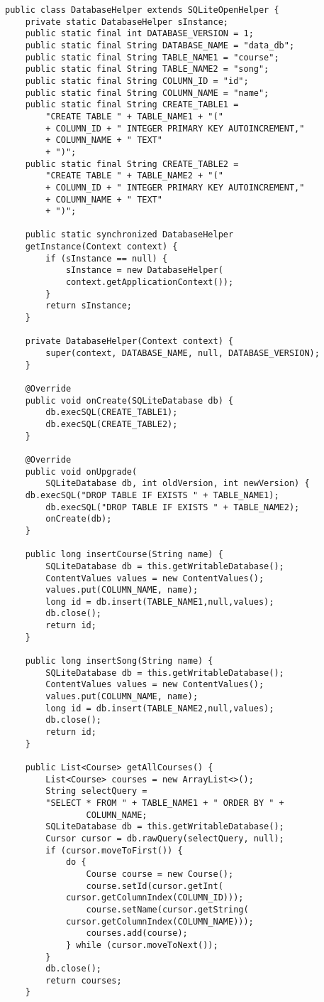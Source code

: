 \documentclass[12pt]{article}
\begin{document}
	\begin{lstlisting}
public class DatabaseHelper extends SQLiteOpenHelper {
    private static DatabaseHelper sInstance;
    public static final int DATABASE_VERSION = 1;
    public static final String DATABASE_NAME = "data_db";
    public static final String TABLE_NAME1 = "course";
    public static final String TABLE_NAME2 = "song";
    public static final String COLUMN_ID = "id";
    public static final String COLUMN_NAME = "name";
    public static final String CREATE_TABLE1 =
        "CREATE TABLE " + TABLE_NAME1 + "("
        + COLUMN_ID + " INTEGER PRIMARY KEY AUTOINCREMENT,"
        + COLUMN_NAME + " TEXT"
        + ")";
    public static final String CREATE_TABLE2 =
        "CREATE TABLE " + TABLE_NAME2 + "("
        + COLUMN_ID + " INTEGER PRIMARY KEY AUTOINCREMENT,"
        + COLUMN_NAME + " TEXT"
        + ")";

    public static synchronized DatabaseHelper 
    getInstance(Context context) {
        if (sInstance == null) {
            sInstance = new DatabaseHelper(
	        context.getApplicationContext());
        }
        return sInstance;
    }

    private DatabaseHelper(Context context) {
        super(context, DATABASE_NAME, null, DATABASE_VERSION);
    }

    @Override
    public void onCreate(SQLiteDatabase db) {
        db.execSQL(CREATE_TABLE1);
        db.execSQL(CREATE_TABLE2);
    }

    @Override
    public void onUpgrade(
        SQLiteDatabase db, int oldVersion, int newVersion) {
	db.execSQL("DROP TABLE IF EXISTS " + TABLE_NAME1);
        db.execSQL("DROP TABLE IF EXISTS " + TABLE_NAME2);
        onCreate(db);
    }

    public long insertCourse(String name) {
        SQLiteDatabase db = this.getWritableDatabase();
        ContentValues values = new ContentValues();
        values.put(COLUMN_NAME, name);
        long id = db.insert(TABLE_NAME1,null,values);
        db.close();
        return id;
    }

    public long insertSong(String name) {
        SQLiteDatabase db = this.getWritableDatabase();
        ContentValues values = new ContentValues();
        values.put(COLUMN_NAME, name);
        long id = db.insert(TABLE_NAME2,null,values);
        db.close();
        return id;
    }

    public List<Course> getAllCourses() {
        List<Course> courses = new ArrayList<>();
        String selectQuery =
	    "SELECT * FROM " + TABLE_NAME1 + " ORDER BY " +
                COLUMN_NAME;
        SQLiteDatabase db = this.getWritableDatabase();
        Cursor cursor = db.rawQuery(selectQuery, null);
        if (cursor.moveToFirst()) {
            do {
                Course course = new Course();
                course.setId(cursor.getInt(
		    cursor.getColumnIndex(COLUMN_ID)));
                course.setName(cursor.getString(
		    cursor.getColumnIndex(COLUMN_NAME)));
                courses.add(course);
            } while (cursor.moveToNext());
        }
        db.close();
        return courses;
    }


\end{lstlisting}
\end{document}

